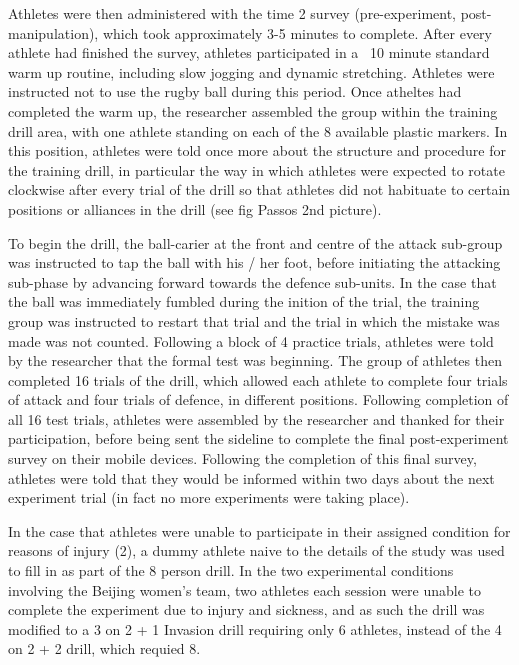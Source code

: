 \documentclass[english]{article}\usepackage[]{graphicx}\usepackage[]{color}
\begin{document}
Athletes were then administered with the time 2 survey (pre-experiment, post-manipulation), which took approximately 3-5 minutes to complete.  After every athlete had finished the survey, athletes participated in a ~10 minute standard warm up routine, including slow jogging and dynamic stretching.  Athletes were instructed not to use the rugby ball during this period.  Once atheltes had completed the warm up, the researcher assembled the group within the training drill area, with one athlete standing on each of the 8 available plastic markers.  In this position, athletes were told once more about the structure and procedure for the training drill, in particular the way in which athletes were expected to rotate clockwise after every trial of the drill so that athletes did not habituate to certain positions or alliances in the drill (see fig Passos 2nd picture).

To begin the drill, the ball-carier at the front and centre of the attack sub-group was instructed to tap the ball with his / her foot, before initiating the attacking sub-phase by advancing forward towards the defence sub-units.  In the case that the ball was immediately fumbled during the inition of the trial, the training group was instructed to restart that trial and the trial in which the mistake was made was not counted.  Following a block of 4 practice trials, athletes were told by the researcher that the formal test was beginning. The group of athletes then completed 16 trials of the drill, which allowed each athlete to complete four trials of attack and four trials of defence, in different positions.  Following completion of all 16 test trials, athletes were assembled by the researcher and thanked for their participation, before being sent the sideline to complete the final post-experiment survey on their mobile devices.  Following the completion of this final survey, athletes were told that they would be informed within two days about the next experiment trial (in fact no more experiments were taking place).

In the case that athletes were unable to participate in their assigned condition for reasons of injury (2), a dummy athlete naive to the details of the study was used to fill in as part of the 8 person drill.  In the two experimental conditions involving the Beijing women's team, two athletes each session were unable to complete the experiment due to injury and sickness, and as such the drill was modified to a 3 on 2 + 1 Invasion drill requiring only 6 athletes, instead of the 4 on 2 + 2 drill, which requied 8.
\end{document}
